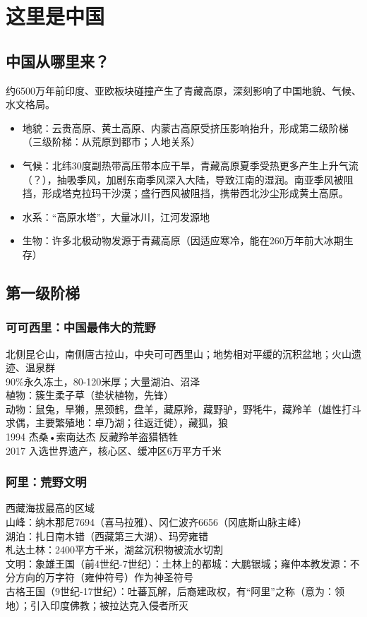 
\chapter{这里是中国}

\section*{中国从哪里来？}

约6500万年前印度、亚欧板块碰撞产生了青藏高原，深刻影响了中国地貌、气候、水文格局。
\begin{itemize}
\item 地貌：云贵高原、黄土高原、内蒙古高原受挤压影响抬升，形成第二级阶梯（三级阶梯：从荒原到都市；人地关系）
\item 气候：北纬30度副热带高压带本应干旱，青藏高原夏季受热更多产生上升气流（？），抽吸季风，加剧东南季风深入大陆，导致江南的湿润。南亚季风被阻挡，形成塔克拉玛干沙漠；盛行西风被阻挡，携带西北沙尘形成黄土高原。
\item 水系：“高原水塔”，大量冰川，江河发源地
\item 生物：许多北极动物发源于青藏高原（因适应寒冷，能在260万年前大冰期生存）
\end{itemize}

\section{第一级阶梯}

\subsection*{可可西里：中国最伟大的荒野}

北侧昆仑山，南侧唐古拉山，中央可可西里山；地势相对平缓的沉积盆地；火山遗迹、温泉群\\
90\%永久冻土，80-120米厚；大量湖泊、沼泽\\
植物：簇生柔子草（垫状植物，先锋）\\
动物：鼠兔，旱獭，黑颈鹤，盘羊，藏原羚，藏野驴，野牦牛，藏羚羊（雄性打斗求偶，主要繁殖地：卓乃湖；往返迁徙），藏狐，狼\\
1994 杰桑•索南达杰 反藏羚羊盗猎牺牲\\
2017 入选世界遗产，核心区、缓冲区6万平方千米

\subsection*{阿里：荒野文明}

西藏海拔最高的区域\\
山峰：纳木那尼7694（喜马拉雅）、冈仁波齐6656（冈底斯山脉主峰）\\
湖泊：扎日南木错（西藏第三大湖）、玛旁雍错\\
札达土林：2400平方千米，湖盆沉积物被流水切割\\
文明：象雄王国（前4世纪-7世纪）：土林上的都城：大鹏银城；雍仲本教发源：不分方向的万字符（雍仲符号）作为神圣符号\\
古格王国（9世纪-17世纪）：吐蕃瓦解，后裔建政权，有“阿里”之称（意为：领地）；引入印度佛教；被拉达克入侵者所灭

